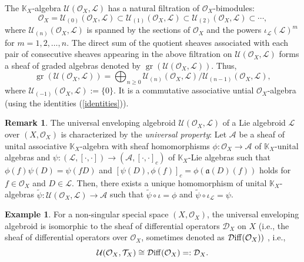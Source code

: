 \documentclass[pdftex]{sigma}
\numberwithin{equation}{section}
\theoremstyle{definition}
\newtheorem{Exm}[Thm]{Example}
\newtheorem{Rem}[Thm]{Remark}
\begin{document}
The $\mathbb{K}_X$-algebra $\mathcal{U}(\mathcal{O}_X,\mathcal{L})$ has a natural filtration of $\mathcal{O}_X$-bimodules:
\[
\mathcal{O}_X = \mathcal{U}_{(0)}(\mathcal{O}_X,\mathcal{L}) \subset \mathcal{U}_{(1)}(\mathcal{O}_X,\mathcal{L}) \subset \mathcal{U}_{(2)}(\mathcal{O}_X,\mathcal{L}) \subset \cdots,
\]
where $\mathcal{U}_{(n)}(\mathcal{O}_X,\mathcal{L})$ is spanned by the sections of $\mathcal{O}_X$ and the powers $\iota_{\mathcal{L}}(\mathcal{L})^m$ for $m = 1,2, \dots ,n$.
The direct sum of the quotient sheaves associated with each pair of consecutive sheaves appearing in the above filtration on $\mathcal{U}(\mathcal{O}_X,\mathcal{L})$ forms a sheaf of graded algebras denoted by $\operatorname{gr}(\mathcal{U}(\mathcal{O}_X,\mathcal{L}))$. Thus,
\[
\operatorname{gr}(\mathcal{U}(\mathcal{O}_X,\mathcal{L})) = \bigoplus_{n\geq 0} \mathcal{U}_{(n)}(\mathcal{O}_X,\mathcal{L})/\mathcal{U}_{(n-1)}(\mathcal{O}_X,\mathcal{L}),
\]
where $\mathcal{U}_{(-1)}(\mathcal{O}_X,\mathcal{L}):= \{0\}$. It is a commutative associative untial $\mathcal{O}_X$-algebra (using the identities (\ref{identities})).

\begin{Rem}\label{Uni prop}
	The universal enveloping algebroid $\mathcal{U}(\mathcal{O}_X,\mathcal{L})$ of a Lie algebroid $\mathcal{L}$ over $(X, \mathcal{O}_X)$ is characterized by the \emph{universal property}: \label{Universal}	
	Let $\mathcal{A}$ be a sheaf of unital associative $\mathbb{K}_X$-algebra with sheaf homomorphisms $\phi\colon \mathcal{O}_X \rightarrow \mathcal{A}$ of $\mathbb{K}_X$-unital algebras and $\psi\colon (\mathcal{L}, [\cdot,\cdot]) \rightarrow (\mathcal{A}, [\cdot,\cdot]_c)$ of $\mathbb{K}_X$-Lie algebras such that $\phi(f)\psi(D) = \psi(fD)$ and $[\psi(D), \phi(f)]_c = \phi(\mathfrak{a}(D)(f))$ holds for $f \in \mathcal{O}_X$ and $D \in \mathcal{L}$. Then, there exists a unique homomorphism of unital $\mathbb{K}_X$-algebras $\widetilde{\psi}\colon \mathcal{U}(\mathcal{O}_X, \mathcal{L}) \rightarrow \mathcal{A}$ such that $\widetilde{\psi} \circ \iota = \phi$ and $\widetilde{\psi} \circ \iota_{\mathcal{L}} = \psi$.
\end{Rem}
\begin{Exm}
For a non-singular special space $(X,\mathcal{O}_X)$, the universal enveloping algebroid is isomorphic to the sheaf of differential operators $\mathcal{D}_X$ on $X$ (i.e., the sheaf of differential operators over $\mathcal{O}_X$, sometimes denoted as $\mathcal{D}{\rm iff}(\mathcal{O}_X))$ \cite{AA, TS}, i.e.,
\[
\mathcal{U}(\mathcal{O}_X, \mathcal{T}_X) \cong \mathcal{D}{\rm iff}(\mathcal{O}_X)=:\mathcal{D}_X.
\]
\end{Exm}
\end{document}
